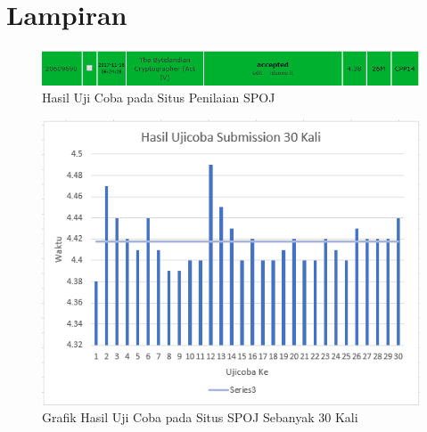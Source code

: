  \chapter{Lampiran}
   \begin{figure}[H]
   \centering
  	\includegraphics[scale=0.53]{images/lampiran/best.png}
  	\caption{Hasil Uji Coba pada Situs Penilaian SPOJ}
  	\label{fig:best_submission}
  	\end{figure}
	
	 \begin{figure}[H]
  \centering
  	 \includegraphics[scale=0.7]{images/lampiran/uji31.png}
  	\caption{Grafik Hasil Uji Coba pada Situs SPOJ Sebanyak 30 Kali}
  	\label{fig:chart}
  \end{figure}  	
  	
